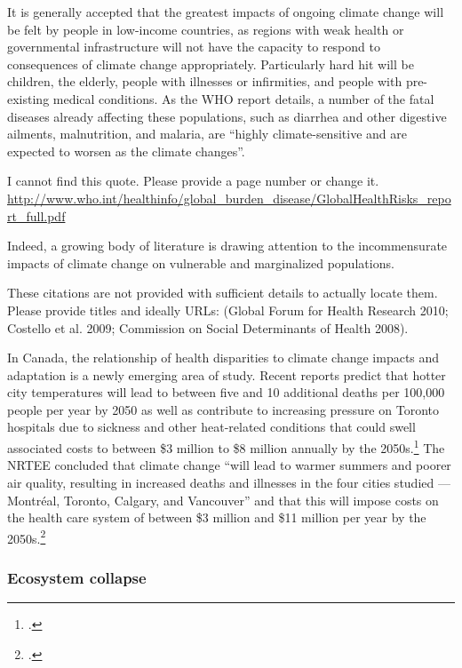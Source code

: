 It is generally accepted that the greatest impacts of ongoing climate change will be felt by people in low-income countries, as regions with weak health or governmental infrastructure will not have the capacity to respond to consequences of climate change appropriately. 
Particularly hard hit will be children, the elderly, people with illnesses or infirmities, and people with pre-existing medical conditions. 
As the WHO report details, a number of the fatal diseases already affecting these populations, such as diarrhea and other digestive ailments, malnutrition, and malaria, are ``highly climate-sensitive and are expected to worsen as the climate changes''.

\begin{vcom}
I cannot find this quote. Please provide a page number or change it. \url{http://www.who.int/healthinfo/global_burden_disease/GlobalHealthRisks_report_full.pdf}
\end{vcom}

Indeed, a growing body of literature is drawing attention to the incommensurate impacts of climate change on vulnerable and marginalized populations. 

\begin{vcom}
These citations are not provided with sufficient details to actually locate them. Please provide titles and ideally URLs: (Global Forum for Health Research 2010; Costello et al. 2009; Commission on Social Determinants of Health 2008).
\end{vcom}


In Canada, the relationship of health disparities to climate change impacts and adaptation is a newly emerging area of study. 
Recent reports predict that hotter city temperatures will lead to between five and 10 additional deaths per 100,000 people per year by 2050 as well as contribute to increasing pressure on Toronto hospitals due to sickness and other heat-related conditions that could swell associated costs to between \$3 million to \$8 million annually by the 2050s.\footcite[][p. 87]{NRTEEPrice}
The NRTEE concluded that climate change ``will lead to warmer summers and poorer air quality, resulting in increased deaths and illnesses in the four cities studied — Montréal, Toronto, Calgary, and Vancouver'' and that this will impose costs on the health care system of between \$3 million and \$11 million per year by the 2050s.\footcite[][p. 16]{NRTEEPrice}



	\subsubsection{Ecosystem collapse}
	
